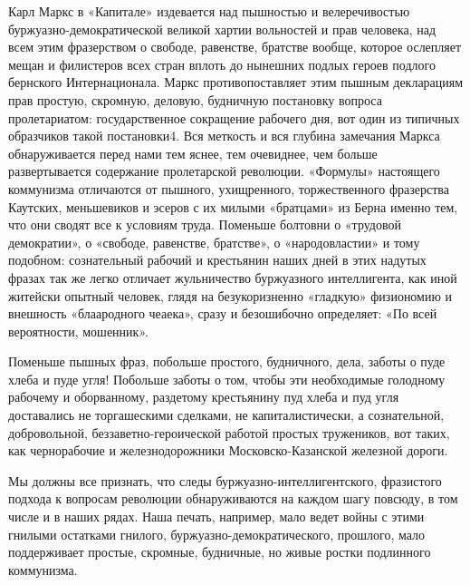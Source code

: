 \documentclass[12pt]{article}
\newcommand{\parnum}{(\arabic{parcount})}
\newcounter{parcount}
\newenvironment{parnumbers}{%
  \par%
  \everypar{\noindent \stepcounter{parcount}\marginpar[]{\parnum}}%
}{}
\begin{document}
\begin{parnumbers}
Карл Маркс в «Капитале» издевается над пышностью и велеречивостью буржуазно-демократической великой хартии вольностей и прав человека, над всем этим фразерством о свободе, равенстве, братстве вообще, которое ослепляет мещан и филистеров всех стран вплоть до нынешних подлых героев подлого бернского Интернационала. Маркс противопоставляет этим пышным декларациям прав простую, скромную, деловую, будничную постановку вопроса пролетариатом: государственное сокращение рабочего дня, вот один из типичных образчиков такой постановки4. Вся меткость и вся глубина замечания Маркса обнаруживается перед нами тем яснее, тем очевиднее, чем больше развертывается содержание пролетарской революции. «Формулы» настоящего коммунизма отличаются от пышного, ухищренного, торжественного фразерства Каутских, меньшевиков и эсеров с их милыми «братцами» из Берна именно тем, что они сводят все к условиям труда. Поменьше болтовни о «трудовой демократии», о «свободе, равенстве, братстве», о «народовластии» и тому подобном: сознательный рабочий и крестьянин наших дней в этих надутых фразах так же легко отличает жульничество буржуазного интеллигента, как иной житейски опытный человек, глядя на безукоризненно «гладкую» физиономию и внешность «блаародного чеаека», сразу и безошибочно определяет: «По всей вероятности, мошенник».

Поменьше пышных фраз, побольше простого, будничного, дела, заботы о пуде хлеба и пуде угля! Побольше заботы о том, чтобы эти необходимые голодному рабочему и оборванному, раздетому крестьянину пуд хлеба и пуд угля доставались не торгашескими сделками, не капиталистически, а сознательной, добровольной, беззаветно-героической работой простых тружеников, вот таких, как чернорабочие и железнодорожники Московско-Казанской железной дороги.

Мы должны все признать, что следы буржуазно-интеллигентского, фразистого подхода к вопросам революции обнаруживаются на каждом шагу повсюду, в том числе и в наших рядах. Наша печать, например, мало ведет войны с этими гнилыми остатками гнилого, буржуазно-демократического, прошлого, мало поддерживает простые, скромные, будничные, но живые ростки подлинного коммунизма.


\end{parnumbers}
\end{document}
